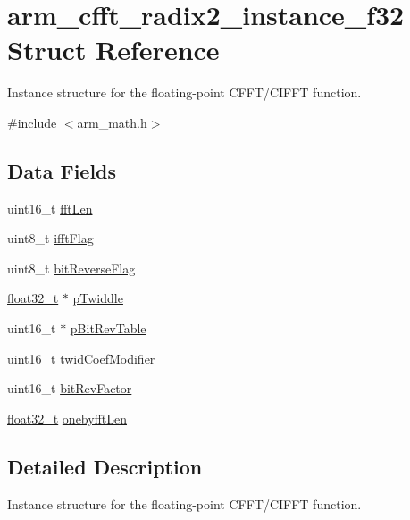 \hypertarget{structarm__cfft__radix2__instance__f32}{}\section{arm\+\_\+cfft\+\_\+radix2\+\_\+instance\+\_\+f32 Struct Reference}
\label{structarm__cfft__radix2__instance__f32}


Instance structure for the floating-\/point C\+F\+F\+T/\+C\+I\+F\+FT function.  




{\ttfamily \#include $<$arm\+\_\+math.\+h$>$}

\subsection*{Data Fields}
\begin{DoxyCompactItemize}
\item 
uint16\+\_\+t \mbox{\hyperlink{structarm__cfft__radix2__instance__f32_ab8db3bbe7c61e6bb8ca2a55e3446e11a}{fft\+Len}}
\item 
uint8\+\_\+t \mbox{\hyperlink{structarm__cfft__radix2__instance__f32_ad6ca6e223f986ebfd94c5ee1e410aa73}{ifft\+Flag}}
\item 
uint8\+\_\+t \mbox{\hyperlink{structarm__cfft__radix2__instance__f32_a09a221a818c6d0e064557a99e2fe9a8b}{bit\+Reverse\+Flag}}
\item 
\mbox{\hyperlink{arm__math_8h_a4611b605e45ab401f02cab15c5e38715}{float32\+\_\+t}} $\ast$ \mbox{\hyperlink{structarm__cfft__radix2__instance__f32_aca581481fccdff0f557f54a3ef20d967}{p\+Twiddle}}
\item 
uint16\+\_\+t $\ast$ \mbox{\hyperlink{structarm__cfft__radix2__instance__f32_a46a2fb328199897af100fea0bfdf59aa}{p\+Bit\+Rev\+Table}}
\item 
uint16\+\_\+t \mbox{\hyperlink{structarm__cfft__radix2__instance__f32_afe772e5b5001c9d8e85032115a8df5bf}{twid\+Coef\+Modifier}}
\item 
uint16\+\_\+t \mbox{\hyperlink{structarm__cfft__radix2__instance__f32_a33386d95319dc3ee7097b3a8e52e01ec}{bit\+Rev\+Factor}}
\item 
\mbox{\hyperlink{arm__math_8h_a4611b605e45ab401f02cab15c5e38715}{float32\+\_\+t}} \mbox{\hyperlink{structarm__cfft__radix2__instance__f32_acf295a7b97b7d48a9cae4d1ab5ed00f6}{onebyfft\+Len}}
\end{DoxyCompactItemize}


\subsection{Detailed Description}
Instance structure for the floating-\/point C\+F\+F\+T/\+C\+I\+F\+FT function. 

